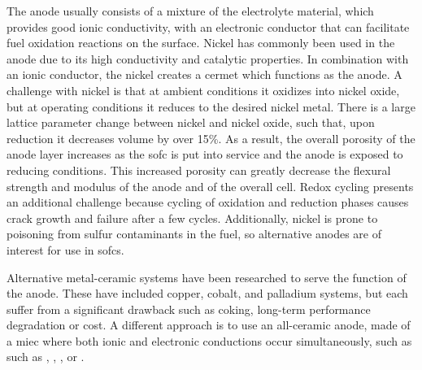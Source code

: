     The anode usually consists of a mixture of the electrolyte material, which provides good ionic conductivity, with an electronic conductor that can facilitate fuel oxidation reactions on the surface.
    Nickel has commonly been used in the anode due to its high conductivity and catalytic properties.%
    In combination with an ionic conductor, the nickel creates a cermet which functions as the anode.
    A challenge with nickel is that at ambient conditions it oxidizes into nickel oxide, but at operating conditions it reduces to the desired nickel metal.
    There is a large lattice parameter change between nickel and nickel oxide, such that, upon reduction it decreases volume by over 15\%.
    As a result, the overall porosity of the anode layer increases as the \gls{sofc} is put into service and the anode is exposed to reducing conditions.\cite{Gutierrez-Mora2002,Yu2007}
    This increased porosity can greatly decrease the flexural strength and modulus of the anode and of the overall cell.\cite{Callister2014,Barsoum2003}
    Redox cycling presents an additional challenge because cycling of oxidation and reduction phases causes crack growth and failure after a few cycles.\cite{Radovic2004, Radovic2004b, Laurencin2010, Pihlatie2009, Laurencin2009, Yu2007, Sarantaridis2007}
    Additionally, nickel is prone to poisoning from sulfur contaminants in the fuel, so alternative anodes are of interest for use in \glspl{sofc}.\cite{Nagel2009,Haga2008,Papurello2016,Lussier2008}

    Alternative metal-ceramic systems have been researched to serve the function of the anode.
    These have included copper, cobalt, and palladium systems, but each suffer from a significant drawback such as coking, long-term performance degradation or cost.\cite{Lee2004,Lu2007,He2005}
    A different approach is to use an all-ceramic anode, made of a \gls{miec} where both ionic and electronic conductions occur simultaneously, such as such as , , , or .\cite{Goodenough2007,Zha2005,Primdahl2001,Hussain2013,MohammedHussain2012,Hussain2016,Huang2006}

